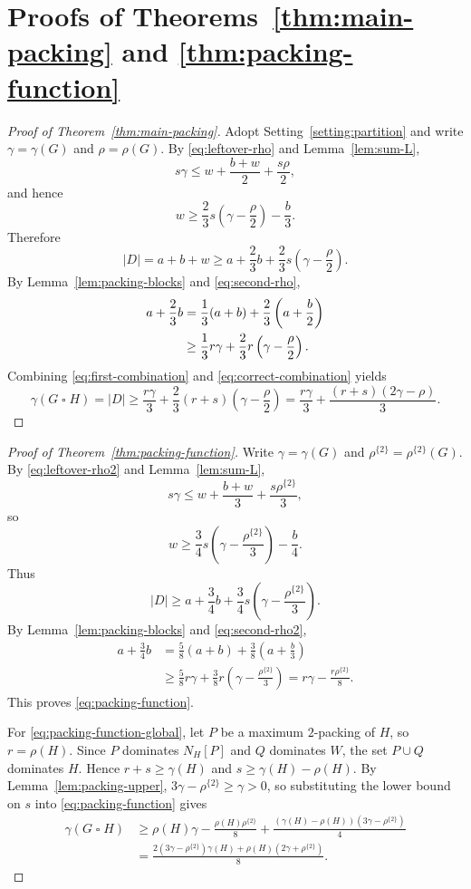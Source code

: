 \documentclass[10pt]{amsart}
\theoremstyle{remark}
\newcommand{\N}{N}
\newcommand{\rhoTwo}{\rho^{\{2\}}}
\begin{document}
\section{Proofs of Theorems~\ref{thm:main-packing} and
\ref{thm:packing-function}}\label{sec:proofs}

\begin{proof}[Proof of Theorem~\ref{thm:main-packing}]
Adopt Setting~\ref{setting:partition} and write
$\gamma=\gamma(G)$ and $\rho=\rho(G)$. By
\eqref{eq:leftover-rho} and Lemma~\ref{lem:sum-L},
\[
 s\gamma\leq w+\frac{b+w}{2}+\frac{s\rho}{2},
\]
and hence
\[
 w\geq\frac23s\left(\gamma-\frac\rho2\right)-\frac b3.
\]
Therefore
\begin{equation}
 |D|=a+b+w
 \geq a+\frac23b+\frac23s\left(\gamma-\frac\rho2\right).
 \label{eq:first-combination}
\end{equation}
By Lemma~\ref{lem:packing-blocks} and \eqref{eq:second-rho},
\begin{align}
 a+\frac23b
 &=\frac13(a+b)+\frac23\left(a+\frac b2\right)\notag\\
 &\geq\frac13r\gamma
 +\frac23r\left(\gamma-\frac\rho2\right).
 \label{eq:correct-combination}
\end{align}
Combining \eqref{eq:first-combination} and
\eqref{eq:correct-combination} yields
\[
 \gamma(G\mathbin{\square}H)=|D|
 \geq\frac{r\gamma}{3}
 +\frac23(r+s)\left(\gamma-\frac\rho2\right)
 =\frac{r\gamma}{3}+\frac{(r+s)(2\gamma-\rho)}3.
\]
\end{proof}

\begin{proof}[Proof of Theorem~\ref{thm:packing-function}]
Write $\gamma=\gamma(G)$ and $\rhoTwo=\rhoTwo(G)$. By
\eqref{eq:leftover-rho2} and Lemma~\ref{lem:sum-L},
\[
 s\gamma\leq w+\frac{b+w}{3}+\frac{s\rhoTwo}{3},
\]
so
\[
 w\geq\frac34s\left(\gamma-\frac{\rhoTwo}{3}\right)-\frac b4.
\]
Thus
\[
 |D|\geq a+\frac34b
 +\frac34s\left(\gamma-\frac{\rhoTwo}{3}\right).
\]
By Lemma~\ref{lem:packing-blocks} and \eqref{eq:second-rho2},
\begin{align*}
 a+\frac34b
 &=\frac58(a+b)+\frac38\left(a+\frac b3\right)\\
 &\geq\frac58r\gamma
 +\frac38r\left(\gamma-\frac{\rhoTwo}{3}\right)
 =r\gamma-\frac{r\rhoTwo}{8}.
\end{align*}
This proves \eqref{eq:packing-function}.

For \eqref{eq:packing-function-global}, let $P$ be a maximum $2$-packing of
$H$, so $r=\rho(H)$. Since $P$ dominates $\N_H[P]$ and $Q$ dominates $W$,
the set $P\cup Q$ dominates $H$. Hence
$r+s\geq\gamma(H)$ and $s\geq\gamma(H)-\rho(H)$. By
Lemma~\ref{lem:packing-upper},
$3\gamma-\rhoTwo\geq\gamma>0$, so substituting the lower bound on $s$ into
\eqref{eq:packing-function} gives
\begin{align*}
 \gamma(G\mathbin{\square}H)
 &\geq \rho(H)\gamma-\frac{\rho(H)\rhoTwo}{8}
 +\frac{(\gamma(H)-\rho(H))(3\gamma-\rhoTwo)}4\\
 &=\frac{2(3\gamma-\rhoTwo)\gamma(H)
 +\rho(H)(2\gamma+\rhoTwo)}8.
\end{align*}
\end{proof}
\end{document}
